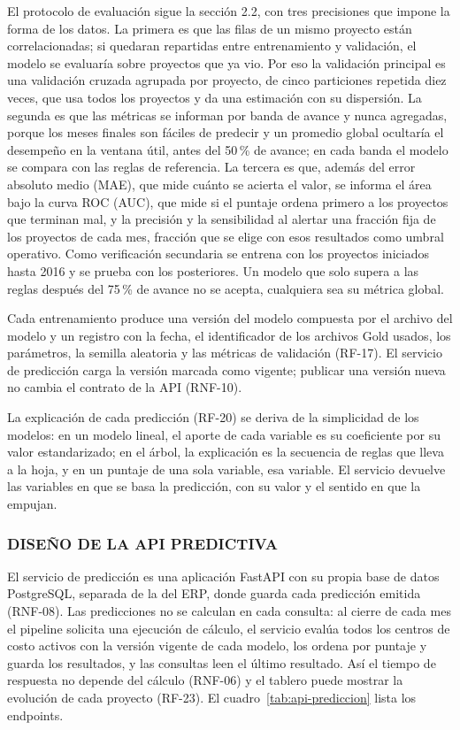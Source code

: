 El protocolo de evaluación sigue la sección 2.2, con tres precisiones que impone la forma de los datos. La primera es que las filas de un mismo proyecto están correlacionadas; si quedaran repartidas entre entrenamiento y validación, el modelo se evaluaría sobre proyectos que ya vio. Por eso la validación principal es una validación cruzada agrupada por proyecto, de cinco particiones repetida diez veces, que usa todos los proyectos y da una estimación con su dispersión. La segunda es que las métricas se informan por banda de avance y nunca agregadas, porque los meses finales son fáciles de predecir y un promedio global ocultaría el desempeño en la ventana útil, antes del 50\,\% de avance; en cada banda el modelo se compara con las reglas de referencia. La tercera es que, además del error absoluto medio (MAE), que mide cuánto se acierta el valor, se informa el área bajo la curva ROC (AUC), que mide si el puntaje ordena primero a los proyectos que terminan mal, y la precisión y la sensibilidad al alertar una fracción fija de los proyectos de cada mes, fracción que se elige con esos resultados como umbral operativo. Como verificación secundaria se entrena con los proyectos iniciados hasta 2016 y se prueba con los posteriores. Un modelo que solo supera a las reglas después del 75\,\% de avance no se acepta, cualquiera sea su métrica global.

Cada entrenamiento produce una versión del modelo compuesta por el archivo del modelo y un registro con la fecha, el identificador de los archivos Gold usados, los parámetros, la semilla aleatoria y las métricas de validación (RF-17). El servicio de predicción carga la versión marcada como vigente; publicar una versión nueva no cambia el contrato de la API (RNF-10).

La explicación de cada predicción (RF-20) se deriva de la simplicidad de los modelos: en un modelo lineal, el aporte de cada variable es su coeficiente por su valor estandarizado; en el árbol, la explicación es la secuencia de reglas que lleva a la hoja, y en un puntaje de una sola variable, esa variable. El servicio devuelve las variables en que se basa la predicción, con su valor y el sentido en que la empujan.

\subsubsection{DISEÑO DE LA API PREDICTIVA}

El servicio de predicción es una aplicación FastAPI con su propia base de datos PostgreSQL, separada de la del ERP, donde guarda cada predicción emitida (RNF-08). Las predicciones no se calculan en cada consulta: al cierre de cada mes el pipeline solicita una ejecución de cálculo, el servicio evalúa todos los centros de costo activos con la versión vigente de cada modelo, los ordena por puntaje y guarda los resultados, y las consultas leen el último resultado. Así el tiempo de respuesta no depende del cálculo (RNF-06) y el tablero puede mostrar la evolución de cada proyecto (RF-23). El cuadro~\ref{tab:api-prediccion} lista los endpoints.

